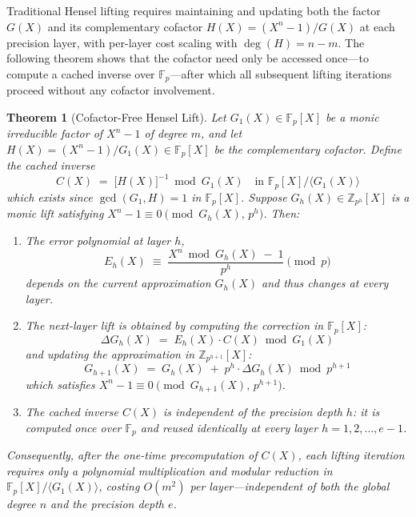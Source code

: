 \documentclass[12pt]{article}
\theoremstyle{plain}
\newtheorem{thm}{Theorem}
\begin{document}
Traditional Hensel lifting requires maintaining and updating both the factor $G(X)$ and its complementary cofactor $H(X) = (X^n-1)/G(X)$ at each precision layer, with per-layer cost scaling with $\deg(H) = n - m$. The following theorem shows that the cofactor need only be accessed once---to compute a cached inverse over $\mathbb{F}_p$---after which all subsequent lifting iterations proceed without any cofactor involvement.

\begin{thm}[Cofactor-Free Hensel Lift] \label{thm:cofactor_free}
Let $G_1(X) \in \mathbb{F}_p[X]$ be a monic irreducible factor of $X^n - 1$ of degree $m$, and let $H(X) = (X^n - 1)/G_1(X) \in \mathbb{F}_p[X]$ be the complementary cofactor. Define the cached inverse
\begin{equation}
    C(X) \;=\; \bigl[H(X)\bigr]^{-1} \bmod G_1(X) \quad \text{in } \mathbb{F}_p[X]/\langle G_1(X) \rangle
\end{equation}
which exists since $\gcd(G_1, H) = 1$ in $\mathbb{F}_p[X]$. Suppose $G_h(X) \in \mathbb{Z}_{p^h}[X]$ is a monic lift satisfying $X^n - 1 \equiv 0 \pmod{G_h(X), \, p^h}$. Then:

\begin{enumerate}
    \item[\textup{(1)}] The error polynomial at layer $h$,
    \begin{equation}
        E_h(X) \;\equiv\; \frac{X^n \bmod G_h(X) \;-\; 1}{p^h} \pmod{p}
    \end{equation}
    depends on the current approximation $G_h(X)$ and thus \emph{changes at every layer}.
    
    \item[\textup{(2)}] The next-layer lift is obtained by computing the correction in $\mathbb{F}_p[X]$:
    \begin{equation} \label{eq:cofactor_free_correction}
        \Delta G_h(X) \;=\; E_h(X) \cdot C(X) \bmod G_1(X)
    \end{equation}
    and updating the approximation in $\mathbb{Z}_{p^{h+1}}[X]$:
    \begin{equation} \label{eq:cofactor_free_update}
        G_{h+1}(X) \;=\; G_h(X) \;+\; p^h \cdot \Delta G_h(X) \bmod p^{h+1}
    \end{equation}
    which satisfies $X^n - 1 \equiv 0 \pmod{G_{h+1}(X), \, p^{h+1}}$.
    
    \item[\textup{(3)}] The cached inverse $C(X)$ is independent of the precision depth $h$: it is computed once over $\mathbb{F}_p$ and reused identically at every layer $h = 1, 2, \dots, e-1$.
\end{enumerate}
Consequently, after the one-time precomputation of $C(X)$, each lifting iteration requires only a polynomial multiplication and modular reduction in $\mathbb{F}_p[X]/\langle G_1(X) \rangle$, costing $O(m^2)$ per layer---independent of both the global degree $n$ and the precision depth $e$.
\end{thm}
\end{document}
